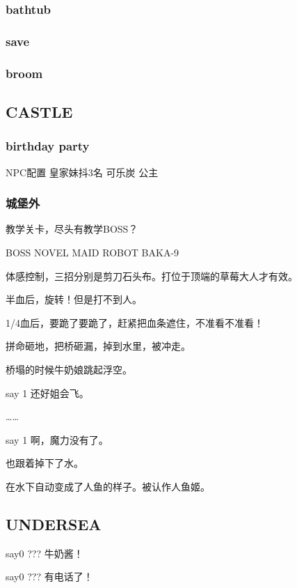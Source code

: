 \documentclass{article}
\begin{document}
\subsubsection{bathtub}

\subsubsection{save}

\subsubsection{broom}

\subsection{CASTLE}

\subsubsection{birthday party}

NPC配置 皇家妹抖3名 可乐炭 公主

\subsubsection{城堡外}

教学关卡，尽头有教学BOSS？

BOSS NOVEL MAID ROBOT BAKA-9

体感控制，三招分别是剪刀石头布。打位于顶端的草莓大人才有效。

半血后，旋转！但是打不到人。

1/4血后，要跪了要跪了，赶紧把血条遮住，不准看不准看！

拼命砸地，把桥砸漏，掉到水里，被冲走。

桥塌的时候牛奶娘跳起浮空。

say 1 还好姐会飞。

……

say 1 啊，魔力没有了。

也跟着掉下了水。

在水下自动变成了人鱼的样子。被认作人鱼姬。

\subsection{UNDERSEA}

say0 ??? 牛奶酱！

say0 ??? 有电话了！
\end{document}
